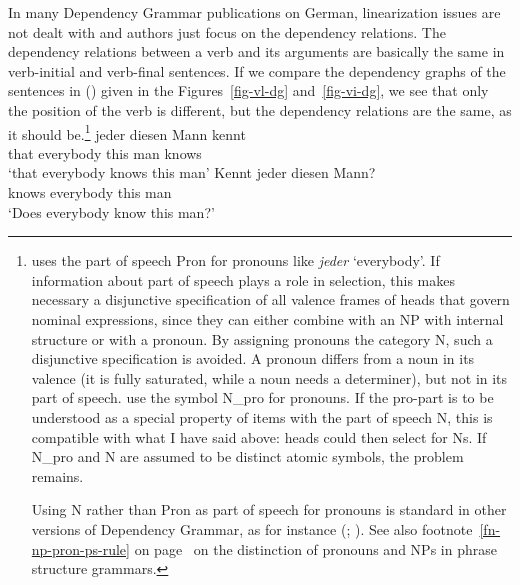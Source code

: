 In many Dependency Grammar publications on German, linearization issues are not dealt with and
authors just focus on the dependency relations. The dependency relations between a verb
and its arguments are basically the same in verb-initial and verb-final sentences. If we compare the
dependency graphs of the sentences in () given in
the Figures~\ref{fig-vl-dg} and~\ref{fig-vi-dg}, we see that only the position of the verb is
different, but the dependency relations are the same, as it should be.\footnote{%
  \citet{Eroms2000a} uses the part of speech Pron for pronouns like \emph{jeder}
  `everybody'. If information about part of speech plays a role in selection, this makes necessary a
  disjunctive specification of all valence frames of heads that govern nominal expressions, since
  they can either combine with an NP with internal structure or with a pronoun. By assigning
  pronouns the category N, such a disjunctive specification is avoided. A pronoun differs from a noun
  in its valence (it is fully saturated, while a noun needs a determiner), but not in its part of
  speech. \citet[]{EH2003a} use the symbol N\_pro for pronouns. If the pro-part is to be understood as
  a special property of items with the part of speech N, this is compatible with what I have said
  above: heads could then select for Ns. If N\_pro and N are assumed to be distinct atomic symbols,
  the problem remains.

  Using N rather than Pron as part of speech for pronouns is standard in other versions of
  Dependency Grammar, as for instance \wg (\citealp[]{Hudson90a-u}; \citealp[]{Hudson2007a-u}).
  See also footnote~\ref{fn-np-pron-ps-rule} on page~\pageref{fn-np-pron-ps-rule} on the distinction
  of pronouns and NPs in phrase structure grammars.%
}
\eal
\ex
\gll [dass] jeder diesen Mann kennt\\
     \spacebr{}that everybody this man knows\\
\glt `that everybody knows this man'
\ex
\gll Kennt jeder diesen Mann?\\
     knows everybody this man\\
\glt `Does everybody know this man?'
\zl

